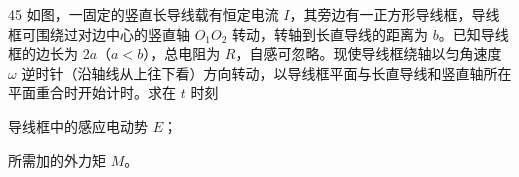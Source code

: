 \begin{problem}[第32届全国中学生物理竞赛复赛][导线框在磁场中转动]{45}
    如图，一固定的竖直长导线载有恒定电流 $I$，其旁边有一正方形导线框，导线框可围绕过对边中心的竖直轴 $O_{1}O_{2}$ 转动，转轴到长直导线的距离为 $b$。已知导线框的边长为 $2a$（$a < b$），总电阻为 $R$，自感可忽略。现使导线框绕轴以匀角速度 $\omega$ 逆时针（沿轴线从上往下看）方向转动，以导线框平面与长直导线和竖直轴所在平面重合时开始计时。求在 $t$ 时刻
    \begin{subproblem}
        导线框中的感应电动势 $E$；
    \end{subproblem}
    \begin{subproblem}
        所需加的外力矩 $M$。
    \end{subproblem}
\end{problem}